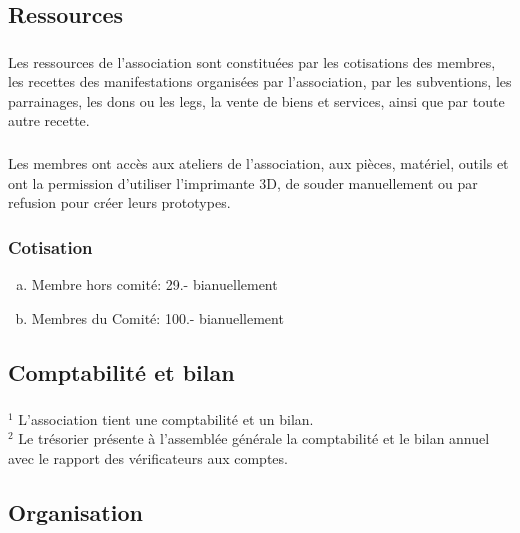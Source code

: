 \documentclass[12pt,a4paper,oneside]{article}
\newcounter{art}
\newcommand{\french}{    \switchcolumn[1]\noindent}
\newcounter{para}
\begin{document}
\begin{paracol}{2}
\french 
	\subsection{Ressources}


\french
	\subsubsection{}
	Les ressources de l’association sont constituées par les cotisations des membres, les recettes des manifestations organisées par l’association, par les subventions, les parrainages, les dons ou les legs, la vente de biens et services, ainsi que par toute autre recette.

\french
	\subsubsection{} 
	Les membres ont accès aux ateliers de l’association, aux pièces, matériel, outils et ont la permission d’utiliser l’imprimante 3D, de souder manuellement ou par refusion pour créer leurs prototypes.


\french
	\subsubsection{Cotisation}
	\begin{enumerate}[(a)]
	\item Membre hors comité: 29.- bianuellement
	\item Membres du Comité: 100.- bianuellement
	\end{enumerate}


\french 
	\subsection{Comptabilité et bilan}
	\subsubsection{}

	$^1$ L’association tient une comptabilité et un bilan. \\
	$^2$ Le trésorier présente à l’assemblée générale la comptabilité et le bilan annuel avec le rapport des vérificateurs aux comptes. 


\french
	\subsection{Organisation}


\end{paracol}
\end{document}
